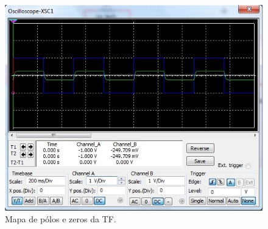 \documentclass[
	article,			%
	11pt,				%
	oneside,			%
	a4paper,			%
	english,			%
	brazil,				%
	sumario=tradicional
	]{abntex2}
\begin{document}
\begin{figure}[h]
  \includegraphics[width=\linewidth, center]{multisim_response.jpg}
  \caption{Mapa de pólos e zeros da TF.}
  \label{fig:response}
\end{figure}

\newpage


\end{document}
